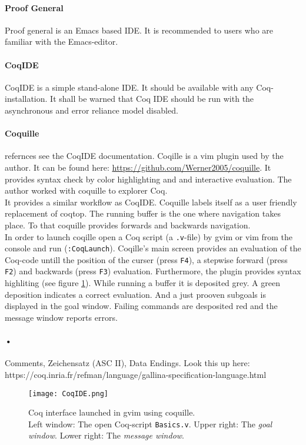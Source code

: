 \paragraph{Proof General}
Proof general is an Emacs based IDE. 
It is recommended to users who are familiar with the Emacs-editor.

\paragraph{CoqIDE}
CoqIDE is a simple stand-alone IDE. 
It should be available with any Coq-installation. 
It shall be warned that Coq IDE should be run with the asynchronous and error reliance model disabled. 

\paragraph{Coquille}
refernces see the CoqIDE documentation.
Coqille is a vim plugin used by the author.
It can be found here: \url{https://github.com/Werner2005/coquille}.
It provides syntax check by color highlighting and and interactive evaluation.  
The author worked with coquille to explorer Coq.\\
It provides a similar workflow as CoqIDE. 
Coquille labels itself as a user friendly  replacement of \gls{coqtop}. 
The running buffer is the one where navigation takes place. 
To that coquille provides forwards and backwards navigation.\\


In order to launch coqille open a Coq script (a \texttt{.v}-file) by gvim or vim from the console and run (\texttt{:CoqLaunch}). 
Coqille's main screen provides an evaluation of the Coq-code untill the position of the curser (press \texttt{F4}), a stepwise forward (press \texttt{F2}) and backwards (press \texttt{F3}) evaluation.                 
Furthermore, the plugin provides syntax highliting (see figure \ref{fig:Coquille}).
While running a buffer it is deposited grey.
A green deposition indicates a correct evaluation. 
And a just prooven subgoals is displayed in the goal window. 
Failing commands are desposited red and the message window reports errors.

\paragraph{•}

Comments, Zeichensatz (ASC II), Data Endings.
Look this up here:\\
https://coq.inria.fr/refman/language/gallina-specification-language.html



\begin{figure}[h]
\texttt{[image: CoqIDE.png]}
\caption{Coq interface launched in gvim using coquille.\\ 
Left window: The open Coq-script \texttt{Basics.v}.
Upper right: The {\itshape goal window}. 
Lower right: The {\itshape message window}.}
\label{fig:Coquille}
\end{figure}


